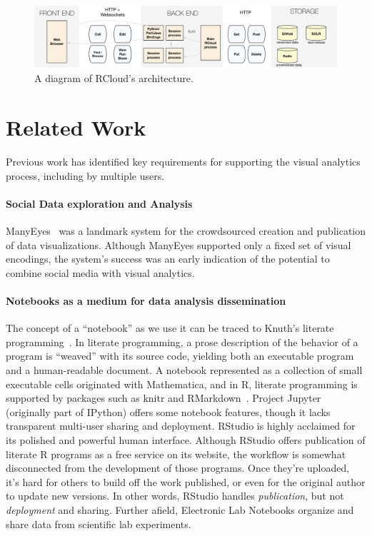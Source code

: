 \begin{figure}
\centering
\includegraphics[width=.9\linewidth]{fig/system/system.pdf}
\caption{\label{fig:system}A diagram of RCloud's architecture. }
\end{figure}

\section{Related Work\label{sec:related}}

Previous work has identified key requirements for supporting the
visual analytics process, including by multiple users.

\paragraph*{Social Data exploration and Analysis}
ManyEyes~\cite{Viegas:2007:MAS} was a landmark system for the
crowdsourced creation and publication of data visualizations.
Although ManyEyes supported only a fixed set of visual encodings,
the system's success was an early indication of the potential to
combine social media with visual analytics.

\paragraph*{Notebooks as a medium for data analysis dissemination}
The concept of a ``notebook'' as we use it can be traced
to Knuth's literate programming~\cite{Knuth:1984:LP}.
In literate programming, a prose description of the behavior of
a program is ``weaved'' with its source code, yielding both an
executable program and a human-readable document.
A notebook represented as a collection of small executable cells
originated with Mathematica, and in R, literate programming is
supported by packages such as knitr and RMarkdown~\cite{Xie:2013:DDW}.
Project Jupyter~\cite{jupyter} (originally part of
IPython) offers some notebook features, though it lacks transparent
multi-user sharing and deployment.
RStudio is highly acclaimed for its polished and powerful human interface.
Although RStudio offers publication of literate R programs as a free
service on its website, the workflow is somewhat disconnected from
the development of those programs. Once they're uploaded, it's hard
for others to build off the work published, or even for the
original author to update new versions. In other words, RStudio
handles \emph{publication}, but not \emph{deployment} and sharing.
%
Further afield, {Electronic Lab Notebooks} organize
and share data from scientific lab experiments\cite{Rubacha:2011:ELN}.
%

